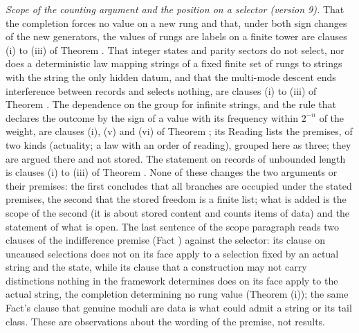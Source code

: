 \emph{Scope of the counting argument and the position on a selector (version 9).} That the completion forces no value on a new rung and that, under both sign changes of the new generators, the values of rungs are labels on a finite tower are clauses (i) to (iii) of Theorem . That integer states and parity sectors do not select, nor does a deterministic law mapping strings of a fixed finite set of rungs to strings with the string the only hidden datum, and that the multi-mode descent ends interference between records and selects nothing, are clauses (i) to (iii) of Theorem . The dependence on the group for infinite strings, and the rule that declares the outcome by the sign of a value with its frequency within $2^{-n}$ of the weight, are clauses (i), (v) and (vi) of Theorem ; its Reading lists the premises, of two kinds (actuality; a law with an order of reading), grouped here as three; they are argued there and not stored. The statement on records of unbounded length is clauses (i) to (iii) of Theorem . None of these changes the two arguments or their premises: the first concludes that all branches are occupied under the stated premises, the second that the stored freedom is a finite list; what is added is the scope of the second (it is about stored content and counts items of data) and the statement of what is open. The last sentence of the scope paragraph reads two clauses of the indifference premise (Fact ) against the selector: its clause on uncaused selections does not on its face apply to a selection fixed by an actual string and the state, while its clause that a construction may not carry distinctions nothing in the framework determines does on its face apply to the actual string, the completion determining no rung value (Theorem (i)); the same Fact's clause that genuine moduli are data is what could admit a string or its tail class. These are observations about the wording of the premise, not results.

